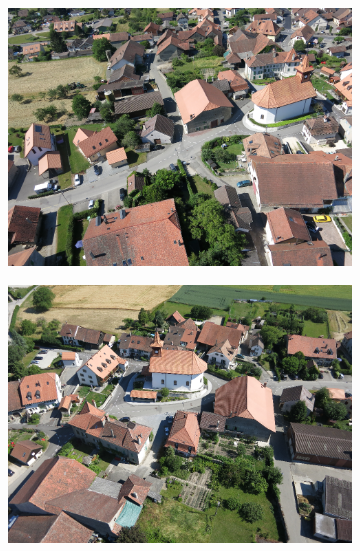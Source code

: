 \documentclass[remotesensing,article,accept,moreauthors,pdftex,10pt,a4paper]{mdpi}
\theoremstyle{mdpi}
\newcounter{ex}
\newcounter{re}
\begin{document}
\begin{figure}[H]
\begin{subfigure}[tbp]{0.275\columnwidth}
           \caption[]{}%
           {{\small }}
           \label{fig:4j}
       \end{subfigure}
       \hfill
       \begin{subfigure}[tbp]{0.21\columnwidth}
           \centering
           \includegraphics[width=\textwidth]{segment/sullens_ori1.png}
           \caption[]{}
           {{\small }}
           \label{fig:4k}
       \end{subfigure}
       \begin{subfigure}[tbp]{0.21\columnwidth}
           \centering
           \includegraphics[width=\textwidth]{segment/sullens_ori2.png}
           \caption[]{}%
           {{\small }}
           \label{fig:4l}
       \end{subfigure}

\end{figure}
\end{document}

